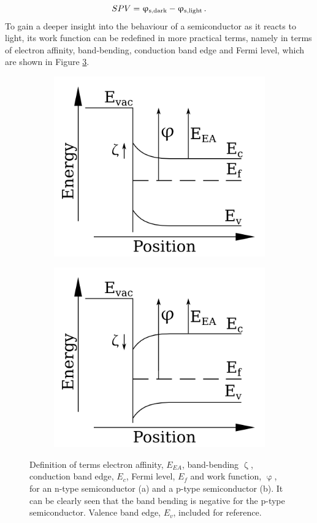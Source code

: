 \begin{equation}
\label{spvs}
	SPV = \upvarphi _{\text{s,dark}} - \upvarphi _{\text{s,light}} \, .
\end{equation}
To gain a deeper insight into the behaviour of a semiconductor as it reacts to light, its work function can be redefined in more practical terms, namely in terms of electron affinity, band-bending, conduction band edge and Fermi level, which are shown in Figure \ref{fig:terms}. 
\begin{figure}
\begin{subfigure}{0.5\textwidth}
\centering
	\includegraphics[width=0.8\linewidth]{./figs/chap2/bbdefn}
	\caption{}
	\label{fig:bbdefn}
\end{subfigure}
\begin{subfigure}{0.5\textwidth}
\centering
	\includegraphics[width=0.8\linewidth]{./figs/chap2/bbdefp}
	\caption{}
	\label{fig:bbdefp}
\end{subfigure}
\caption{Definition of terms electron affinity, $E_{EA}$, band-bending $\upzeta$, conduction band edge, $E_c$, Fermi level, $E_f$ and work function, $\upvarphi$, for an n-type semiconductor (a) and a p-type semiconductor (b). It can be clearly seen that the band bending is negative for the p-type semiconductor. Valence band edge, $E_v$, included for reference.}
\label{fig:terms}
\end{figure}
